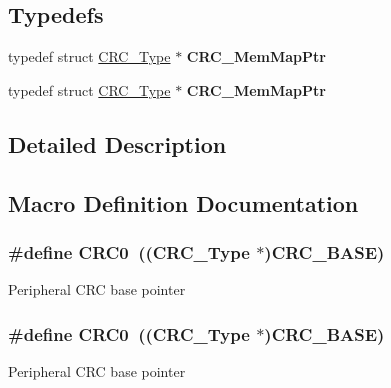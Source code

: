 \subsection*{Typedefs}
\begin{DoxyCompactItemize}
\item 
typedef struct \hyperlink{structCRC__Type}{C\+R\+C\+\_\+\+Type} $\ast$ {\bfseries C\+R\+C\+\_\+\+Mem\+Map\+Ptr}\hypertarget{group__CRC__Peripheral__Access__Layer_ga4c3ab595a4fab17012b960ac751032e0}{}\label{group__CRC__Peripheral__Access__Layer_ga4c3ab595a4fab17012b960ac751032e0}

\item 
typedef struct \hyperlink{structCRC__Type}{C\+R\+C\+\_\+\+Type} $\ast$ {\bfseries C\+R\+C\+\_\+\+Mem\+Map\+Ptr}\hypertarget{group__CRC__Peripheral__Access__Layer_ga4c3ab595a4fab17012b960ac751032e0}{}\label{group__CRC__Peripheral__Access__Layer_ga4c3ab595a4fab17012b960ac751032e0}

\end{DoxyCompactItemize}


\subsection{Detailed Description}


\subsection{Macro Definition Documentation}
\subsubsection[{\texorpdfstring{C\+R\+C0}{CRC0}}]{\setlength{\rightskip}{0pt plus 5cm}\#define C\+R\+C0~(({\bf C\+R\+C\+\_\+\+Type} $\ast$){\bf C\+R\+C\+\_\+\+B\+A\+SE})}\hypertarget{group__CRC__Peripheral__Access__Layer_ga63a00bd3e91184e000bd4dcf87c539f9}{}\label{group__CRC__Peripheral__Access__Layer_ga63a00bd3e91184e000bd4dcf87c539f9}
Peripheral C\+RC base pointer 
\subsubsection[{\texorpdfstring{C\+R\+C0}{CRC0}}]{\setlength{\rightskip}{0pt plus 5cm}\#define C\+R\+C0~(({\bf C\+R\+C\+\_\+\+Type} $\ast$){\bf C\+R\+C\+\_\+\+B\+A\+SE})}\hypertarget{group__CRC__Peripheral__Access__Layer_ga63a00bd3e91184e000bd4dcf87c539f9}{}\label{group__CRC__Peripheral__Access__Layer_ga63a00bd3e91184e000bd4dcf87c539f9}
Peripheral C\+RC base pointer 
